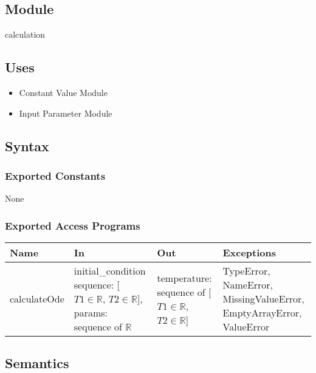 \documentclass[12pt, titlepage]{article}
\begin{document}
\subsection{Module}

calculation

\subsection{Uses}

\begin{itemize}
    \item Constant Value Module 
    \item Input Parameter Module
\end{itemize}

\subsection{Syntax}

\subsubsection{Exported Constants}
None

\subsubsection{Exported Access Programs}

\begin{tabular}{p{3cm} p{5cm} p{4cm} p{2.5cm}}
\hline
\textbf{Name} & \textbf{In} & \textbf{Out} & \textbf{Exceptions} \\
\hline
calculateOde & initial\_condition sequence: [$T1 \in \mathbb{R}$, $T2 \in \mathbb{R}$], params: sequence of $\mathbb{R}$ & temperature: sequence of [$T1 \in \mathbb{R}$, $T2 \in \mathbb{R}$] & TypeError, NameError, MissingValueError, EmptyArrayError, ValueError \\
\hline
\end{tabular}

\subsection{Semantics}
\end{document}
